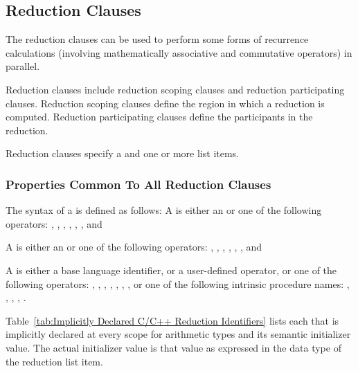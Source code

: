 {{{{\subsection{Reduction Clauses}
\label{subsec:Reduction Clauses}
The reduction clauses can be used to perform some forms of recurrence
calculations (involving mathematically associative and commutative operators)
in parallel.

Reduction clauses include reduction scoping clauses and reduction participating
clauses. Reduction scoping clauses define the region in which a reduction is
computed. Reduction participating clauses define the participants in the
reduction.

Reduction clauses specify a  and one or more list
items.










\subsubsection{Properties Common To All Reduction Clauses}
\label{subsubsec:Properties Common To All Reduction Clauses}

\syntax
The syntax of a  is defined as follows:
\cspecificstart %
A  is either an  or one of the following operators:
\code{+},
\code{-},
\code{*},
\code{\&},
\code{|},
\code{\^},
\code{\&\&} and
\code{||}
\cspecificend %

\cppspecificstart %
A  is either an  or one of the following operators:
\code{+},
\code{-},
\code{*},
\code{\&},
\code{|},
\code{\^},
\code{\&\&} and
\code{||}
\cppspecificend %

\fortranspecificstart
A  is either a base language identifier, or a user-defined operator,
or one of the following operators:
\code{+},
\code{-},
\code{*},
,
,
,
,
 or one of the following intrinsic procedure names:
,
,
,
,
.
\fortranspecificstart


\ccppspecificstart %
Table~\ref{tab:Implicitly Declared C/C++ Reduction Identifiers} lists each
 that is implicitly declared at every scope for
arithmetic types and its semantic initializer value. The actual initializer
value is that value as expressed in the data type of the reduction list item.


}}}}
